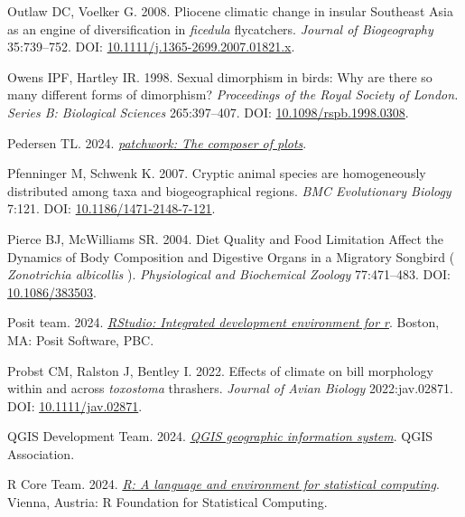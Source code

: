 \documentclass[10pt,a4paper]{article}
\newlength{\cslhangindent}
\newenvironment{CSLReferences}[2] %
 {\begin{list}{}{%
  \setlength{\itemindent}{0pt}
  \setlength{\leftmargin}{0pt}
  \setlength{\parsep}{0pt}
  \ifodd #1
   \setlength{\leftmargin}{\cslhangindent}
   \setlength{\itemindent}{-1\cslhangindent}
  \fi
  \setlength{\itemsep}{#2\baselineskip}}}
 {\end{list}}
\begin{document}
\begin{CSLReferences}{1}{0}
Outlaw DC, Voelker G. 2008. Pliocene climatic change in insular {Southeast} {Asia} as an engine of diversification in \emph{ficedula} flycatchers. \emph{Journal of Biogeography} 35:739--752. DOI: \href{https://doi.org/10.1111/j.1365-2699.2007.01821.x}{10.1111/j.1365-2699.2007.01821.x}.

Owens IPF, Hartley IR. 1998. Sexual dimorphism in birds: Why are there so many different forms of dimorphism? \emph{Proceedings of the Royal Society of London. Series B: Biological Sciences} 265:397--407. DOI: \href{https://doi.org/10.1098/rspb.1998.0308}{10.1098/rspb.1998.0308}.

Pedersen TL. 2024. \emph{\href{https://CRAN.R-project.org/package=patchwork}{{patchwork}: The composer of plots}}.

Pfenninger M, Schwenk K. 2007. Cryptic animal species are homogeneously distributed among taxa and biogeographical regions. \emph{BMC Evolutionary Biology} 7:121. DOI: \href{https://doi.org/10.1186/1471-2148-7-121}{10.1186/1471-2148-7-121}.

Pierce BJ, McWilliams SR. 2004. Diet {Quality} and {Food} {Limitation} {Affect} the {Dynamics} of {Body} {Composition} and {Digestive} {Organs} in a {Migratory} {Songbird} ( \emph{{Zonotrichia} albicollis} ). \emph{Physiological and Biochemical Zoology} 77:471--483. DOI: \href{https://doi.org/10.1086/383503}{10.1086/383503}.

Posit team. 2024. \emph{\href{http://www.posit.co/}{{RStudio}: Integrated development environment for r}}. Boston, MA: Posit Software, PBC.

Probst CM, Ralston J, Bentley I. 2022. Effects of climate on bill morphology within and across \emph{toxostoma} thrashers. \emph{Journal of Avian Biology} 2022:jav.02871. DOI: \href{https://doi.org/10.1111/jav.02871}{10.1111/jav.02871}.

QGIS Development Team. 2024. \emph{\href{https://www.qgis.org}{QGIS geographic information system}}. QGIS Association.

R Core Team. 2024. \emph{\href{https://www.R-project.org/}{{R}: A language and environment for statistical computing}}. Vienna, Austria: R Foundation for Statistical Computing.


\end{CSLReferences}
\end{document}
